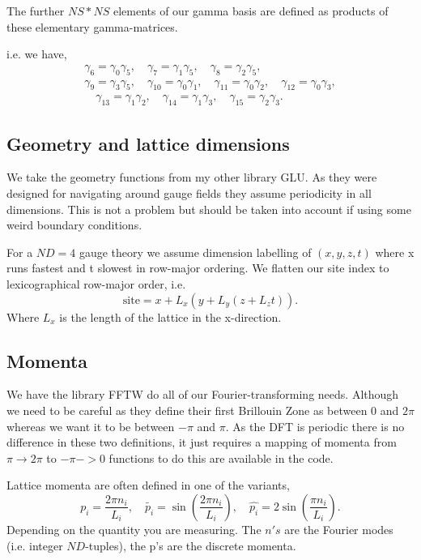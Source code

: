The further $NS*NS$ elements of our gamma basis are defined as products of 
these elementary gamma-matrices.

i.e. we have,
\begin{equation}
\begin{gathered}
\gamma_6 = \gamma_0 \gamma_5, 
\quad \gamma_7 = \gamma_1 \gamma_5, 
\quad \gamma_8 = \gamma_2 \gamma_5, \\
\gamma_9 = \gamma_3 \gamma_5,
\quad \gamma_{10} = \gamma_0\gamma_1, 
\quad \gamma_{11} = \gamma_0\gamma_2,
\quad \gamma_{12} = \gamma_0 \gamma_3,\\
\quad \gamma_{13} = \gamma_1 \gamma_2,
\quad \gamma_{14} = \gamma_1 \gamma_3,
\quad \gamma_{15} = \gamma_2 \gamma_3.
\end{gathered}
\end{equation}

\subsection{Geometry and lattice dimensions}

We take the geometry functions from my other library GLU. As they were designed
for navigating around gauge fields they assume periodicity in all dimensions.
This is not a problem but should be taken into account if using some weird
boundary conditions.

For a $ND=4$ gauge theory we assume dimension labelling of $(x,y,z,t)$ where
x runs fastest and t slowest in row-major ordering. We flatten our site index
to lexicographical row-major order, i.e.
\begin{equation}
\text{site} = x + L_x( y + L_y ( z + L_z t ) ).
\end{equation}
Where $L_x$ is the length of the lattice in the x-direction.

\subsection{Momenta}

We have the library FFTW do all of our Fourier-transforming needs. Although we
need to be careful as they define their first Brillouin Zone as between
$0$ and $2\pi$ whereas we want it to be between $-\pi$ and $\pi$. As the DFT
is periodic there is no difference in these two definitions, it just requires a
mapping of momenta from $\pi \rightarrow 2\pi$ to $-\pi -> 0$ functions to do
this are available in the code.

Lattice momenta are often defined in one of the variants,
\begin{equation}
p_i = \frac{2\pi n_i}{L_i},\quad \tilde{p_i}=\sin\left(\frac{2\pi n_i}{L_i}\right),
\quad \hat{p_i}=2\sin\left(\frac{\pi n_i}{L_i}\right).
\end{equation}
Depending on the quantity you are measuring. The $n's$ are the Fourier modes 
(i.e. integer $ND$-tuples), the p's are the discrete momenta.

